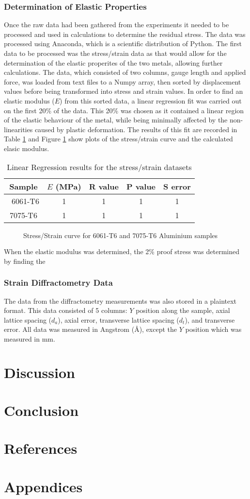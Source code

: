 \documentclass[11pt, oneside]{article}   	%
\begin{document}
\subsubsection{Determination of Elastic Properties}
Once the raw data had been gathered from the experiments it needed to be processed and used in calculations to determine the residual stress. The data was processed using Anaconda, which is a scientific distribution of Python.
The first data to be processed was the stress/strain data as that would allow for the determination of the elastic properites of the two metals, allowing further calculations. The data, which consisted of two columns, gauge length and applied force, was loaded from text files to a Numpy array, then sorted by displacement values before being transformed into stress and strain values.
In order to find an elastic modulus ($E$) from this sorted data, a linear regression fit was carried out on the first 20\% of the data. This 20\% was chosen as it contained a linear region of the elastic behaviour of the metal, while being minimally affected by the non-linearities caused by plastic deformation. The results of this fit are recorded in Table \ref{tab:b} and Figure \ref{fig:StressStrain} show plots of the stress/strain curve and the calculated elasic modulus.
\begin{table}[h]
	\centering
	\caption{Linear Regression results for the stress/strain datasets}\label{tab:b}
	\begin{tabular}[c]{c | c c c c}
	Sample & $E$ (\si{\mega\pascal}) & R value & P value & S error \\ \hline\
	6061-T6 & 1 & 1 & 1 & 1 \\
	7075-T6 & 1 & 1 & 1 & 1 \\
	\end{tabular}
\end{table}
\begin{figure}
	\caption{Stress/Strain curve for 6061-T6 and 7075-T6 Aluminium samples}\label{fig:StressStrain}
\end{figure}
When the elastic modulus was determined, the 2\% proof stress was determined by finding the 
\subsubsection{Strain Diffractometry Data}
The data from the diffractometry measurements was also stored in a plaintext format. This data consisted of 5 columns: $Y$ position along the sample, axial lattice spacing ($d_a$), axial error, transverse lattice spacing ($d_t$), and transverse error. All data was measured in Angstrom (\si{\angstrom}), except the $Y$ position which was measured in \si{\milli\meter}.
\section{Discussion}
\section{Conclusion}
\section{References}
\section{Appendices}
\end{document}
